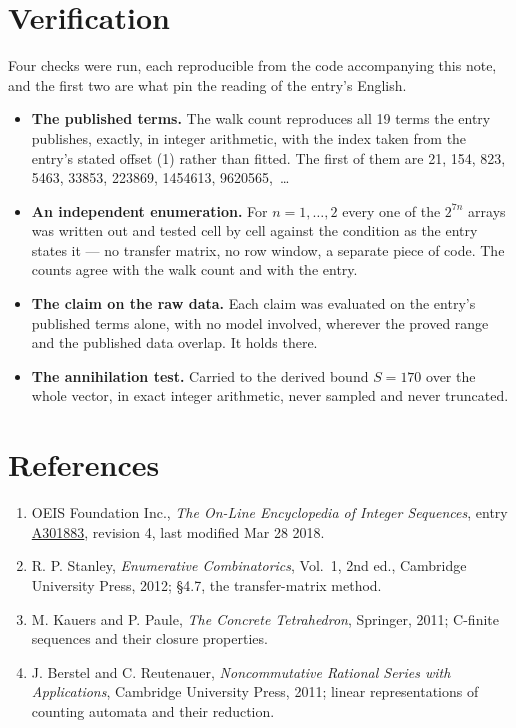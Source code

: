 \documentclass[11pt]{article}
\theoremstyle{definition}
\begin{document}
\section{Verification}

Four checks were run, each reproducible from the code accompanying this note, and the first two are what pin the reading of the entry's English.

\begin{itemize}

\item {\bfseries The published terms.} The walk count reproduces all 19 terms the entry publishes, exactly, in integer arithmetic, with the index taken from the entry's stated offset (1) rather than fitted. The first of them are 21, 154, 823, 5463, 33853, 223869, 1454613, 9620565,~\dots

\item {\bfseries An independent enumeration.} For $n = 1,\dots,2$ every one of the $2^{7n}$ arrays was written out and tested cell by cell against the condition as the entry states it --- no transfer matrix, no row window, a separate piece of code. The counts agree with the walk count and with the entry.

\item {\bfseries The claim on the raw data.} Each claim was evaluated on the entry's published terms alone, with no model involved, wherever the proved range and the published data overlap. It holds there.

\item {\bfseries The annihilation test.} Carried to the derived bound $S = 170$ over the whole vector, in exact integer arithmetic, never sampled and never truncated.

\end{itemize}

\section{References}

\begin{enumerate}

\item OEIS Foundation Inc., \emph{The On-Line Encyclopedia of Integer Sequences}, entry \href{https://oeis.org/A301883}{A301883}, revision 4, last modified Mar 28 2018.

\item R. P. Stanley, \emph{Enumerative Combinatorics}, Vol.~1, 2nd ed., Cambridge University Press, 2012; \S4.7, the transfer-matrix method.

\item M. Kauers and P. Paule, \emph{The Concrete Tetrahedron}, Springer, 2011; C-finite sequences and their closure properties.

\item J. Berstel and C. Reutenauer, \emph{Noncommutative Rational Series with Applications}, Cambridge University Press, 2011; linear representations of counting automata and their reduction.

\end{enumerate}
\end{document}
